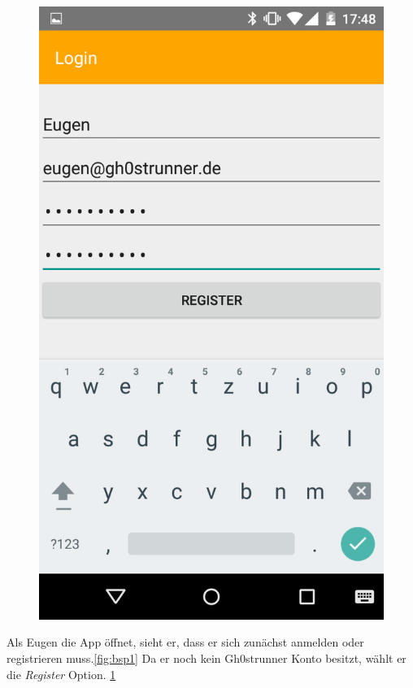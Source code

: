 \begin{figure}[!h]
\begin{minipage}{.4\textwidth}
  \includegraphics[width=.8\linewidth]{abb/bsp/bsp2}
  \label{fig:bsp2}
\end{minipage}
\end{figure}

Als Eugen die App öffnet, sieht er, dass er sich zunächst anmelden oder registrieren muss.\ref{fig:bsp1} Da er noch kein Gh0strunner Konto besitzt, wählt er die \textit{Register} Option. \ref{fig:bsp2}


